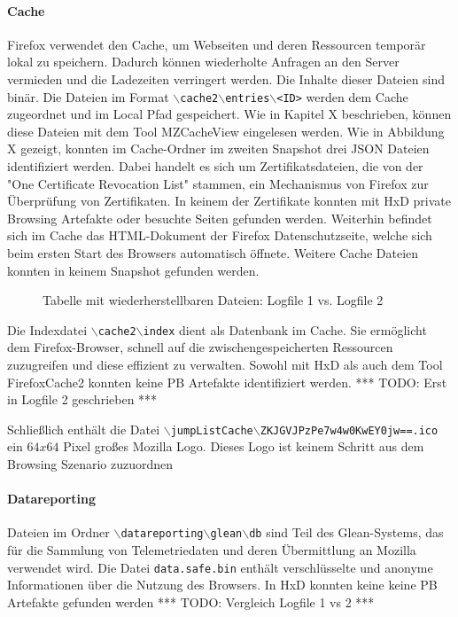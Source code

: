 \paragraph*{Cache}
Firefox verwendet den Cache, um Webseiten und deren Ressourcen temporär lokal zu speichern. Dadurch können wiederholte Anfragen an den Server vermieden und die Ladezeiten verringert werden. Die Inhalte dieser Dateien sind binär.
Die Dateien im Format \texttt{$\backslash$cache2$\backslash$entries$\backslash$<ID>} werden dem Cache zugeordnet und im Local Pfad gespeichert.
Wie in Kapitel X beschrieben, können diese Dateien mit dem Tool MZCacheView eingelesen werden.
Wie in Abbildung X gezeigt, konnten im Cache-Ordner im zweiten Snapshot drei JSON Dateien identifiziert werden. Dabei handelt es sich um Zertifikatsdateien, die von der "One Certificate Revocation List" stammen, ein Mechanismus von Firefox zur Überprüfung von Zertifikaten. In keinem der Zertifikate konnten mit HxD private Browsing Artefakte oder besuchte Seiten gefunden werden.
Weiterhin befindet sich im Cache das HTML-Dokument der Firefox Datenschutzseite, welche sich beim ersten Start des Browsers automatisch öffnete. %
Weitere Cache Dateien konnten in keinem Snapshot gefunden werden.
\begin{figure}[h!]
	\caption{Tabelle mit wiederherstellbaren Dateien: Logfile 1 vs. Logfile 2}
\end{figure}
Die Indexdatei \texttt{$\backslash$cache2$\backslash$index} dient als Datenbank im Cache. Sie ermöglicht dem Firefox-Browser, schnell auf die zwischengespeicherten Ressourcen zuzugreifen und diese effizient zu verwalten. Sowohl mit HxD als auch dem Tool FirefoxCache2 konnten keine PB Artefakte identifiziert werden.
*** TODO: Erst in Logfile 2 geschrieben ***

Schließlich enthält die Datei \texttt{$\backslash$jumpListCache$\backslash$ZKJGVJPzPe7w4w0KwEY0jw==.ico} ein $64x64$ Pixel großes Mozilla Logo. Dieses Logo ist keinem Schritt aus dem Browsing Szenario zuzuordnen


\paragraph*{Datareporting}
Dateien im Ordner \texttt{$\backslash$datareporting$\backslash$glean$\backslash$db} sind Teil des Glean-Systems, das für die Sammlung von Telemetriedaten und deren Übermittlung an Mozilla verwendet wird. 
Die Datei \texttt{data.safe.bin} enthält verschlüsselte und anonyme Informationen über die Nutzung des Browsers. In HxD konnten keine keine PB Artefakte gefunden werden
*** TODO: Vergleich Logfile 1 vs 2 ***

